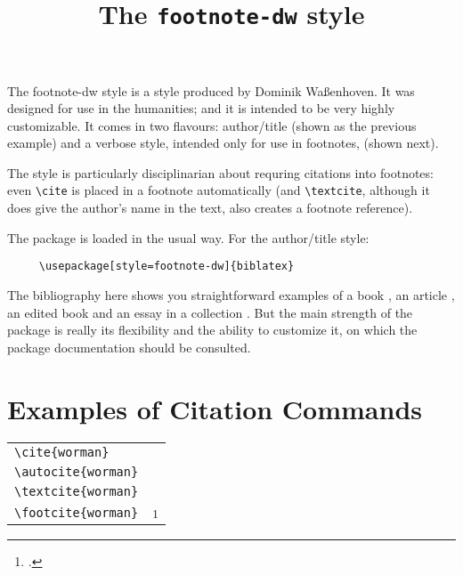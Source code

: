 \documentclass{article}
\begin{document}
 

\title{The \texttt{footnote-dw} style}
\author{}\date{} 
\maketitle 
\thispagestyle{empty}

\noindent
The \textsf{footnote-dw} style is a style produced by Dominik Waßenhoven. It was designed for use in the humanities; and it is intended to be very highly customizable. It comes in two flavours: author/title (shown as the previous example) and a verbose style, intended only for use in footnotes, (shown next).

The style is particularly disciplinarian about requring citations into footnotes: even \verb~\cite~ is placed in a footnote automatically (and \verb~\textcite~, although it does give the author's name in the text, also creates a footnote reference).

\quad The package is loaded in the usual way. For the author/title style:
\begin{verbatim}
     \usepackage[style=footnote-dw]{biblatex}
\end{verbatim}

\quad The bibliography here shows you straightforward examples of a book \autocite{worman}, an article \autocite{reese}, an edited book \autocite{aristotle:anima} and an essay in a collection \autocite{gaonkar:in}.  But the main strength of the package is really its flexibility and the ability to customize it, on which the package documentation should be consulted.

\section*{Examples of Citation Commands}

\begin{tabular}{ll}
\verb|\cite{worman}| & \strut\cite{worman} \\
\verb|\autocite{worman}| & \strut\autocite{worman} \\
\verb|\textcite{worman}| & \textcite{worman} \\
\verb|\footcite{worman}| & \strut\footcite{worman}
\end{tabular}


\printbibliography[title={Sample Bibliography}]
\end{document}
